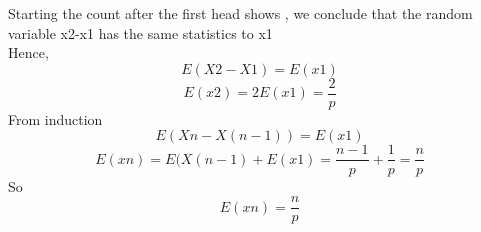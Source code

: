 \documentclass{beamer}
\begin{document}
\begin{frame}
Starting the count after the first head shows , we conclude that the random variable x2-x1 has the same statistics to x1\\ Hence,
\begin{equation}
    E(X2-X1)=E(x1)
    
\end{equation}
\begin{equation}
    E(x2)=2E(x1)=\frac{2}{p}
\end{equation}
From induction
\begin{equation}
    E(Xn-X(n-1))=E(x1)
\end{equation}
\begin{equation}
    E(xn)=E(X(n-1) +E(x1)=\frac{n-1}{p} + \frac{1}{p}=\frac{n}{p}
\end{equation}
So
\begin{equation}
     E(xn)=\frac{n}{p}
\end{equation}

\end{frame}
\end{document}
